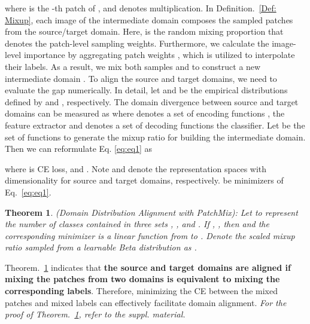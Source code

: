 \documentclass[10pt,twocolumn,letterpaper, ]{article}
\newtheorem{theorem}{Theorem}
\begin{document}
where  is the -th patch of , and  denotes multiplication. In Definition.~\ref{Def: Mixup}, each image  of the intermediate domain composes the sampled patches  from the source/target domain. Here,  is the random mixing proportion that denotes the patch-level sampling weights. Furthermore, we calculate the image-level importance by aggregating patch weights , which is utilized to interpolate their labels. As a result, we mix both samples  and  to construct a new intermediate domain . 
To align the source and target domains, we need to evaluate the gap numerically. In detail, let  and  be the empirical distributions defined by  and , respectively. The domain divergence between source and target domains can be measured as 
{\setlength\abovedisplayskip{2pt}
\setlength\belowdisplayskip{2pt}
}
where  denotes a set of encoding functions \ie, the feature extractor and  denotes a set of decoding functions \ie the classifier. Let  be the set of functions to generate the mixup ratio for building the intermediate domain. Then we can reformulate Eq. \ref{eq:eq1} as
{\setlength\abovedisplayskip{2pt}
\setlength\belowdisplayskip{2pt}
\begin{small}

\end{small}}
where  is CE loss,  and . Note  and  denote the representation spaces with dimensionality  for source and target domains, respectively.  be minimizers of Eq.~\ref{eq:eq1}.
\begin{theorem}
\label{theorem:Distribution estimation1}
(Domain Distribution Alignment with PatchMix): 
Let  to represent the number of classes contained in three sets , , and . If , , then  and the corresponding minimizer  is a linear function from  to . Denote the scaled mixup ratio sampled from a learnable Beta distribution as .
\end{theorem}
Theorem.~\ref{theorem:Distribution estimation1} indicates that \textbf{the source and target domains are aligned if mixing the patches from two domains is equivalent to mixing the corresponding labels}. Therefore, minimizing the CE between the mixed patches and mixed labels can effectively facilitate domain alignment. \textit{For the proof of Theorem.~\ref{theorem:Distribution estimation1}, refer to the suppl. material.}


\vspace{-10pt}
\end{document}
